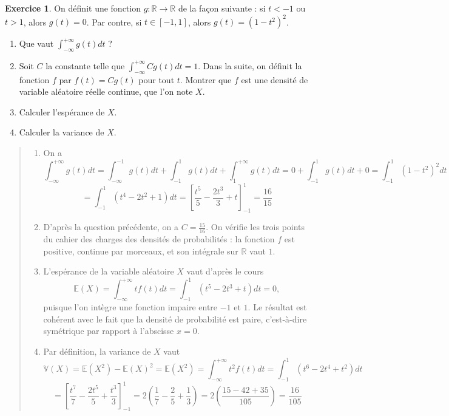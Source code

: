 \documentclass[11pt]{article}
\newcommand{\E}{\mathbb E}
\newcommand{\R}{\mathbb R}
\newcommand{\V}{\mathbb V}
\theoremstyle{definition}
\newtheorem{exo}{Exercice}
\newenvironment{solution}{\begin{quote}\color{teal}}{\end{quote}}
\begin{document}
\begin{exo}

On définit une fonction $g : \mathbb R\to \mathbb R$ de la façon suivante : si $t<-1$ ou $t>1$, alors $g(t)=0$. Par contre, si $t\in [-1,1]$, alors $g(t)=(1-t^2)^2$.

\begin{enumerate}
\item Que vaut $\displaystyle{ \int_{-\infty}^{+\infty} g(t)d\! t}$ ?
\item Soit $C$ la constante telle que $\int_{-\infty}^{+\infty} Cg(t)dt=1$. Dans la suite, on définit la fonction $f$ par $f(t)=Cg(t)
$ pour tout $t$. Montrer que $f$ est une densité de variable aléatoire réelle continue, que l'on note $X$.
\item Calculer l'espérance de $X$.
\item Calculer la variance de $X$.
\end{enumerate}

\begin{solution}
\begin{enumerate}
\item On a
\[ \int_{-\infty}^{+\infty} g(t)d\! t= \int_{-\infty}^{-1} g(t)d\! t+ \int_{-1}^{1} g(t)d\! t+ \int_{1}^{+\infty} g(t)d\! t  = 
0+\int_{-1}^{1} g(t)d\! t+0
=\int_{-1}^{1} (1-t^2)^2d\! t
\]
\[
=\int_{-1}^1 (t^4-2t^2+1)d\!t = \left[ \frac{t^5}{5} -\frac{2t^3}{3} +t \right]_{-1}^1=\boxed{\frac{16}{15}}\]
\item D'après la question précédente,  on a $C=\frac{15}{16}$. On vérifie les trois points du \og cahier des charges\fg{} des densités de probabilités : la fonction $f$ est positive, continue par morceaux, et son intégrale sur $\R$ vaut $1$.
\item L'espérance de la variable aléatoire $X$ vaut d'après le cours 
\[ \E(X) = \int_{-\infty}^{+\infty} tf(t)d\!t
=\int_{-1}^{1} (t^5-2t^3+t)d\!t=0,
\]
puisque  l'on intègre une fonction impaire entre $-1$ et $1$. Le résultat est cohérent avec le fait que la densité de probabilité est paire, c'est-à-dire symétrique par rapport à l'abscisse $x=0$.
\item Par définition, la variance de $X$ vaut 
\[ \V(X) = \E(X^2)-\E(X)^2 = \E(X^2) =  \int_{-\infty}^{+\infty} t^2f(t)d\!t 
= \int_{-1}^{1}(t^6-2t^4+t^2)d\!t
\]
\[
= \left[ \frac{t^7}{7} - \frac{2t^5}{5} + \frac{t^3}{3}\right]_{-1}^{1}
=2\left( \frac{1}{7}-\frac{2}{5}+\frac{1}{3}\right)
=2\left(\frac{15-42+35}{105}\right) = \boxed{\frac{16}{105}}
\]
\end{enumerate}
\end{solution}
\end{exo}
\end{document}

